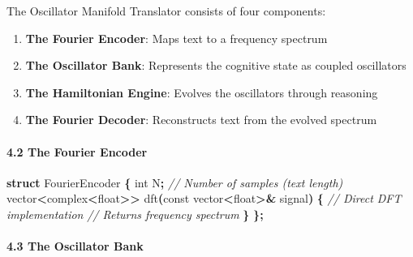\documentclass[
  11pt,
  a4paper,
]{article}
\newenvironment{Shaded}{\begin{snugshade}}{\end{snugshade}}
\newcommand{\AttributeTok}[1]{\textcolor[rgb]{0.13,0.29,0.53}{#1}}
\newcommand{\CommentTok}[1]{\textcolor[rgb]{0.56,0.35,0.01}{\textit{#1}}}
\newcommand{\DataTypeTok}[1]{\textcolor[rgb]{0.13,0.29,0.53}{#1}}
\newcommand{\KeywordTok}[1]{\textcolor[rgb]{0.13,0.29,0.53}{\textbf{#1}}}
\newcommand{\NormalTok}[1]{#1}
\newcommand{\OperatorTok}[1]{\textcolor[rgb]{0.81,0.36,0.00}{\textbf{#1}}}
\providecommand{\tightlist}{%
  \setlength{\itemsep}{0pt}\setlength{\parskip}{0pt}}
\begin{document}
The Oscillator Manifold Translator consists of four components:

\begin{enumerate}
\def\labelenumi{\arabic{enumi}.}
\tightlist
\item
  \textbf{The Fourier Encoder}: Maps text to a frequency spectrum
\item
  \textbf{The Oscillator Bank}: Represents the cognitive state as
  coupled oscillators
\item
  \textbf{The Hamiltonian Engine}: Evolves the oscillators through
  reasoning
\item
  \textbf{The Fourier Decoder}: Reconstructs text from the evolved
  spectrum
\end{enumerate}

\paragraph{4.2 The Fourier Encoder}\label{the-fourier-encoder}

\begin{Shaded}
\begin{Highlighting}[]
\KeywordTok{struct}\NormalTok{ FourierEncoder }\OperatorTok{\{}
    \DataTypeTok{int}\NormalTok{ N}\OperatorTok{;}  \CommentTok{// Number of samples (text length)}
\NormalTok{    vector}\OperatorTok{\textless{}}\NormalTok{complex}\OperatorTok{\textless{}}\DataTypeTok{float}\OperatorTok{\textgreater{}\textgreater{}}\NormalTok{ dft}\OperatorTok{(}\AttributeTok{const}\NormalTok{ vector}\OperatorTok{\textless{}}\DataTypeTok{float}\OperatorTok{\textgreater{}\&}\NormalTok{ signal}\OperatorTok{)} \OperatorTok{\{}
        \CommentTok{// Direct DFT implementation}
        \CommentTok{// Returns frequency spectrum}
    \OperatorTok{\}}
\OperatorTok{\};}
\end{Highlighting}
\end{Shaded}

\paragraph{4.3 The Oscillator Bank}\label{the-oscillator-bank}
\end{document}
